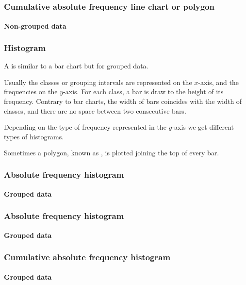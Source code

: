 \begin{frame}
\frametitle{Cumulative absolute frequency line chart or polygon}
\framesubtitle{Non-grouped data}
\begin{center}
\scalebox{0.6}{} 
\end{center} 
\end{frame}


\begin{frame}
\frametitle{Histogram}
A  is similar to a bar chart but for grouped data.  

Usually the classes or grouping intervals are represented on the $x$-axis, and the frequencies on the $y$-axis. 
For each class, a bar is draw to the height of its frequency.
Contrary to bar charts, the width of bars coincides with the width of classes, and there are no space between two
consecutive bars.

Depending on the type of frequency represented in the $y$-axis we get different types of histograms.
 
Sometimes a polygon, known as , is plotted joining the top of every bar.
\end{frame}


\begin{frame}
\frametitle{Absolute frequency histogram}
\framesubtitle{Grouped data}
\begin{center}
\scalebox{0.6}{}
\end{center} 
\end{frame}


\begin{frame}
\frametitle{Absolute frequency histogram}
\framesubtitle{Grouped data}
\begin{center}
\scalebox{0.6}{} 
\end{center} 
\end{frame}


\begin{frame}
\frametitle{Cumulative absolute frequency histogram}
\framesubtitle{Grouped data}
\begin{center}
\scalebox{0.6}{}
\end{center} 
\end{frame}


